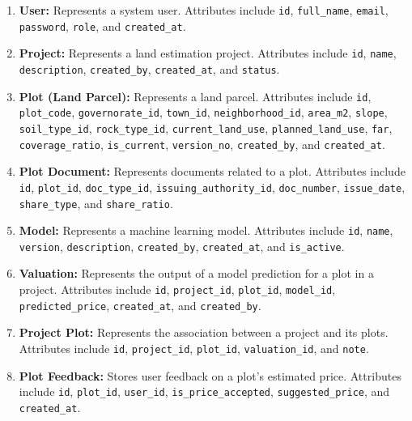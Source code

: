 \documentclass[12pt,oneside]{report}
\begin{document}
\begin{enumerate}
    \item \textbf{User:} Represents a system user. Attributes include \texttt{id}, \texttt{full\_name}, \texttt{email}, \texttt{password}, \texttt{role}, and \texttt{created\_at}.
    
    \item \textbf{Project:} Represents a land estimation project. Attributes include \texttt{id}, \texttt{name}, \texttt{description}, \texttt{created\_by}, \texttt{created\_at}, and \texttt{status}.
    
    \item \textbf{Plot (Land Parcel):} Represents a land parcel. Attributes include \texttt{id}, \texttt{plot\_code}, \texttt{governorate\_id}, \texttt{town\_id}, \texttt{neighborhood\_id}, \texttt{area\_m2}, \texttt{slope}, \texttt{soil\_type\_id}, \texttt{rock\_type\_id}, \texttt{current\_land\_use}, \texttt{planned\_land\_use}, \texttt{far}, \texttt{coverage\_ratio}, \texttt{is\_current}, \texttt{version\_no}, \texttt{created\_by}, and \texttt{created\_at}.
    
    \item \textbf{Plot Document:} Represents documents related to a plot. Attributes include \texttt{id}, \texttt{plot\_id}, \texttt{doc\_type\_id}, \texttt{issuing\_authority\_id}, \texttt{doc\_number}, \texttt{issue\_date}, \texttt{share\_type}, and \texttt{share\_ratio}.
    
    \item \textbf{Model:} Represents a machine learning model. Attributes include \texttt{id}, \texttt{name}, \texttt{version}, \texttt{description}, \texttt{created\_by}, \texttt{created\_at}, and \texttt{is\_active}.
    
    \item \textbf{Valuation:} Represents the output of a model prediction for a plot in a project. Attributes include \texttt{id}, \texttt{project\_id}, \texttt{plot\_id}, \texttt{model\_id}, \texttt{predicted\_price}, \texttt{created\_at}, and \texttt{created\_by}.
    
    \item \textbf{Project Plot:} Represents the association between a project and its plots. Attributes include \texttt{id}, \texttt{project\_id}, \texttt{plot\_id}, \texttt{valuation\_id}, and \texttt{note}.
    
    \item \textbf{Plot Feedback:} Stores user feedback on a plot's estimated price. Attributes include \texttt{id}, \texttt{plot\_id}, \texttt{user\_id}, \texttt{is\_price\_accepted}, \texttt{suggested\_price}, and \texttt{created\_at}.
    

\end{enumerate}
\end{document}
